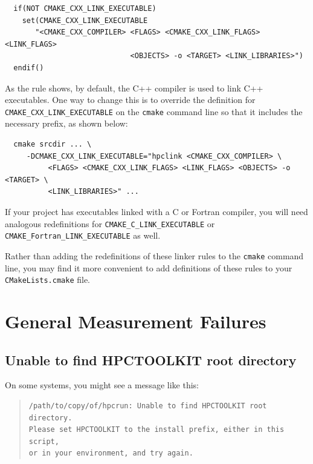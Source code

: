 \documentclass[11pt,twoside,letterpaper]{report}
\begin{document}
\begin{verbatim}
  if(NOT CMAKE_CXX_LINK_EXECUTABLE)
    set(CMAKE_CXX_LINK_EXECUTABLE
       "<CMAKE_CXX_COMPILER> <FLAGS> <CMAKE_CXX_LINK_FLAGS> <LINK_FLAGS>
                             <OBJECTS> -o <TARGET> <LINK_LIBRARIES>")
  endif()
\end{verbatim}

\noindent
As the rule shows, by default, the C++ compiler is used to link C++ executables. One way to change this is to override the definition for \verb|CMAKE_CXX_LINK_EXECUTABLE|  on the {\tt cmake} command line so that it includes the  necessary \hpclink{} prefix, as shown below:

\begin{verbatim}
  cmake srcdir ... \
     -DCMAKE_CXX_LINK_EXECUTABLE="hpclink <CMAKE_CXX_COMPILER> \
          <FLAGS> <CMAKE_CXX_LINK_FLAGS> <LINK_FLAGS> <OBJECTS> -o <TARGET> \
          <LINK_LIBRARIES>" ...
\end{verbatim}

\noindent
If your project has executables linked with a C or Fortran compiler, you will need analogous redefinitions for \verb|CMAKE_C_LINK_EXECUTABLE| or  \verb|CMAKE_Fortran_LINK_EXECUTABLE| as well.

Rather than adding the redefinitions of these linker rules to the {\tt cmake} command line,
you may find it more convenient to add definitions of these rules to your {\tt CMakeLists.cmake} file.


\section{General Measurement Failures}


\subsection{Unable to find HPCTOOLKIT root directory}

On some systems, you might see a message like this:
\begin{quote}
\begin{verbatim}
/path/to/copy/of/hpcrun: Unable to find HPCTOOLKIT root directory.
Please set HPCTOOLKIT to the install prefix, either in this script,
or in your environment, and try again.
\end{verbatim}
\end{quote}
\end{document}
